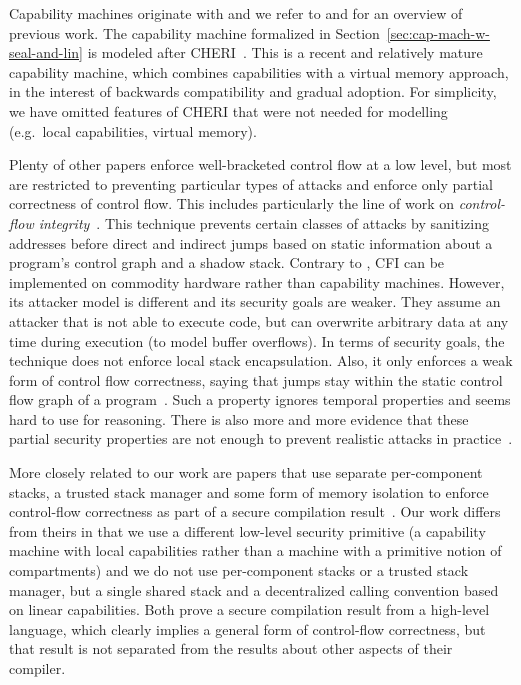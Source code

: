 \documentclass[acmsmall,review,anonymous]{acmart}\settopmatter{printfolios=true,printccs=false,printacmref=false}
\begin{document}
Capability machines originate with \citet{dennis_programming_1966} and we refer to \citet{levy_capability-based_1984} and \citet{watson_cheri:_2015} for an overview of previous work.
The capability machine formalized in Section~\ref{sec:cap-mach-w-seal-and-lin} is modeled after CHERI~\citep{watson_cheri:_2015,woodruff_cheri_2014}.
This is a recent and relatively mature capability machine, which combines capabilities with a virtual memory approach, in the interest of backwards compatibility and gradual adoption.
For simplicity, we have omitted features of CHERI that were not needed for modelling \stktokens{} (e.g.\ local capabilities, virtual memory).

Plenty of other papers enforce well-bracketed control flow at a low level, but most are restricted to preventing particular types of attacks and enforce only partial correctness of control flow.
This includes particularly the line of work on \emph{control-flow integrity}~\citep{abadi_control-flow_2005}.
This technique prevents certain classes of attacks by sanitizing addresses before direct and indirect jumps based on static information about a program's control graph and a shadow stack.
Contrary to \stktokens{}, CFI can be implemented on commodity hardware rather than capability machines.
However, its attacker model is different and its security goals are weaker.
They assume an attacker that is not able to execute code, but can overwrite arbitrary data at any time during execution (to model buffer overflows).
In terms of security goals, the technique does not enforce local stack encapsulation.
Also, it only enforces a weak form of control flow correctness, saying that jumps stay within the static control flow graph of a program~\cite{Abadi2005Theory}.
Such a property ignores temporal properties and seems hard to use for reasoning.
There is also more and more evidence that these partial security properties are not enough to prevent realistic attacks in practice~\citep{Evans:2015:CJW:2810103.2813646,Carlini2015ControlFlowBending}.

More closely related to our work are papers that use separate per-component stacks, a trusted stack manager and some form of memory isolation to enforce control-flow correctness as part of a secure compilation result~\citep{patrignani_modular_2016,juglaret_beyond_2016}.
Our work differs from theirs in that we use a different low-level security primitive (a capability machine with local capabilities rather than a machine with a primitive notion of compartments) and we do not use per-component stacks or a trusted stack manager, but a single shared stack and a decentralized calling convention based on linear capabilities.
Both prove a secure compilation result from a high-level language, which clearly implies a general form of control-flow correctness, but that result is not separated from the results about other aspects of their compiler.
\end{document}
